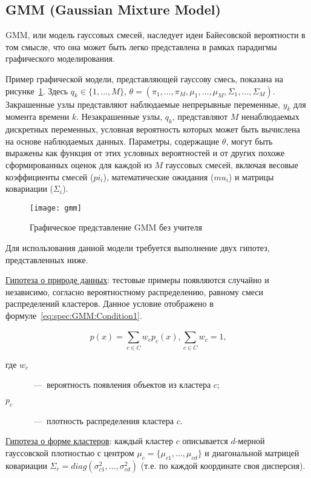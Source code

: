 \subsection{GMM (Gaussian Mixture Model)}
GMM, или модель гауссовых смесей, наследует идеи Байесовской вероятности в том смысле, что она может быть легко представлена в рамках парадигмы графического моделирования.

Пример графической модели, представляющей гауссову смесь, показана на рисунке~\ref{fig:spec:GmmRepresentation}. Здесь $q_k\in \{1,\dots,M\}$, $\theta = (\pi_1,\dots,\pi_M,\mu_1,\dots,\mu_M,\Sigma_1,\dots,\Sigma_M)$. Закрашенные узлы представляют наблюдаемые непрерывные переменные, $y_k$ для момента времени $k$. Незакрашенные узлы, $q_k$, представляют $M$ ненаблюдаемых дискретных переменных, условная вероятность которых может быть вычислена на основе наблюдаемых данных. Параметры, содержащие $\theta$, могут быть выражены как функция от этих условных вероятностей и от других похоже сформированных оценок для каждой из $M$ гауссовых смесей, включая весовые коэффициенты смесей ($pi_i$), математические ожидания ($mu_i$) и матрицы ковариации ($\Sigma_i$).

\begin{figure}[h]
\texttt{[image: gmm]}
\caption{Графическое представление GMM без учителя}
\label{fig:spec:GmmRepresentation}
\end{figure}

Для использования данной модели требуется выполнение двух гипотез, представленных ниже.

\uline{Гипотеза о природе данных}: тестовые примеры появляются случайно и независимо, согласно вероятностному распределению, равному смеси распределений кластеров. Данное условие отображено в формуле~\eqref{eq:spec:GMM:Condition1}.

\begin{equation} \label{eq:spec:GMM:Condition1}
p(x) = \sum_{c\in C}^{} w_c p_c(x), \sum_{c\in C}^{} w_c = 1\text{,}
\end{equation}
\begin{description}
	\item[где $w_c$]~---~вероятность появления объектов из кластера $c$;
	\item[$p_c$]~---~плотность распределения кластера $c$.
\end{description}

\uline{Гипотеза о форме кластеров}: каждый кластер $c$ описывается $d$-мерной гауссовской плотностью с центром $\mu_c = \{\mu_{c1},\dots,\mu_{cd}\}$ и диагональной матрицей ковариации $\Sigma_c = diag(\sigma^2_{c1},\dots,\sigma^2_{cd})$ (т.е. по каждой координате своя дисперсия).

